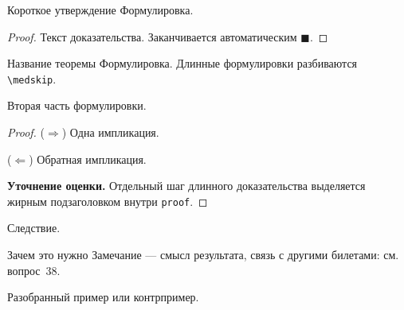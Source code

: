 \begin{Statement}{Короткое утверждение}{}
	Формулировка.
\end{Statement}

\begin{proof}
	Текст доказательства. Заканчивается автоматическим $\blacksquare$.
\end{proof}

\begin{Theorem}[required]{Название теоремы}{}
	Формулировка. Длинные формулировки разбиваются \verb|\medskip|.
	
	\medskip
	Вторая часть формулировки.
\end{Theorem}

\begin{proof}
	($\Rightarrow$) Одна импликация.
	
	($\Leftarrow$) Обратная импликация.
	
	\medskip
	\textbf{Уточнение оценки.} Отдельный шаг длинного доказательства
	выделяется жирным подзаголовком внутри \verb|proof|.
\end{proof}

\begin{Corollary}{}{}
	Следствие.
\end{Corollary}

\begin{Remark}{Зачем это нужно}{}
	Замечание — смысл результата, связь с другими билетами:
	см. вопрос~38.
\end{Remark}

\begin{Example}{}{}
	Разобранный пример или контрпример.
\end{Example}
